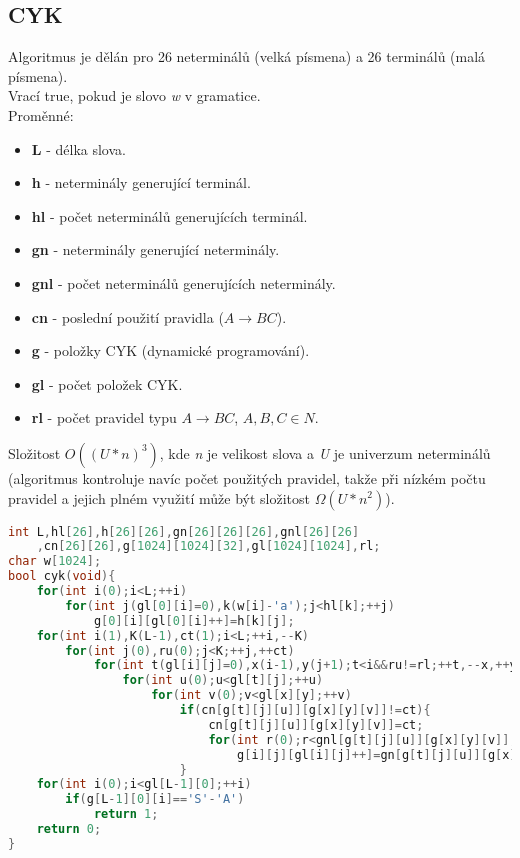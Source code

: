 \documentclass[11pt]{article}
\begin{document}
\subsection{CYK}
Algoritmus je dělán pro 26 neterminálů (velká písmena) a 26 terminálů (malá písmena).
\\Vrací true, pokud je slovo \textsl{w} v gramatice.
\\Proměnné:
\begin{itemize}
\item \textbf{L} - délka slova.
\item \textbf{h} - neterminály generující terminál.
\item \textbf{hl} - počet neterminálů generujících terminál.
\item \textbf{gn} - neterminály generující neterminály. 
\item \textbf{gnl} - počet neterminálů generujících neterminály.
\item \textbf{cn} - poslední použití pravidla ($A\rightarrow BC$).
\item \textbf{g} - položky CYK (dynamické programování).
\item \textbf{gl} - počet položek CYK.
\item \textbf{rl} - počet pravidel typu $A\rightarrow BC$, $A,B,C\in N$.
\end{itemize}
Složitost $O((U*n)^3)$, kde \textsl{n} je velikost slova a \textsl{U} je univerzum neterminálů (algoritmus kontroluje navíc počet použitých pravidel, takže při nízkém počtu pravidel a jejich plném využití může být složitost $\Omega (U*n^2)$).
\begin{lstlisting}[language=C++]
int L,hl[26],h[26][26],gn[26][26][26],gnl[26][26]
    ,cn[26][26],g[1024][1024][32],gl[1024][1024],rl;
char w[1024];
bool cyk(void){
    for(int i(0);i<L;++i)
        for(int j(gl[0][i]=0),k(w[i]-'a');j<hl[k];++j)
            g[0][i][gl[0][i]++]=h[k][j];
    for(int i(1),K(L-1),ct(1);i<L;++i,--K)
        for(int j(0),ru(0);j<K;++j,++ct)
            for(int t(gl[i][j]=0),x(i-1),y(j+1);t<i&&ru!=rl;++t,--x,++y)
                for(int u(0);u<gl[t][j];++u)
                    for(int v(0);v<gl[x][y];++v)
                        if(cn[g[t][j][u]][g[x][y][v]]!=ct){
                            cn[g[t][j][u]][g[x][y][v]]=ct;
                            for(int r(0);r<gnl[g[t][j][u]][g[x][y][v]];++r)
                                g[i][j][gl[i][j]++]=gn[g[t][j][u]][g[x][y][v]][r],++ru;
                        }
    for(int i(0);i<gl[L-1][0];++i)
        if(g[L-1][0][i]=='S'-'A')
            return 1;
    return 0;
}
\end{lstlisting}
\end{document}

